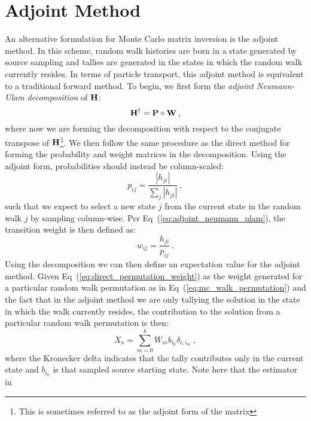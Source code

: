 \section{Adjoint Method}
\label{sec:adjoint_mc}
An alternative formulation for Monte Carlo matrix inversion is the
adjoint method. In this scheme, random walk histories are born in a
state generated by source sampling and tallies are generated in the
states in which the random walk currently resides. In terms of
particle transport, this adjoint method is equivalent to a traditional
forward method. To begin, we first form the \textit{adjoint
  Neumann-Ulam decomposition} of $\mathbf{H}$:
\begin{equation}
  \mathbf{H}^{\dagger} = \mathbf{P} \circ \mathbf{W}\:,
  \label{eq:adjoint_neumann_ulam}
\end{equation}
where now we are forming the decomposition with respect to the
conjugate transpose of $\mathbf{H}$\footnote{This is sometimes referred to
  as the adjoint form of the matrix}. We then follow the same
procedure as the direct method for forming the probability and weight
matrices in the decomposition. Using the adjoint form, probabilities
should instead be column-scaled:
\begin{equation}
  p_{ij} = \frac{|h_{ji}|}{\sum_j |h_{ji}|}\:,
  \label{eq:adjoint_probability}
\end{equation}
such that we expect to select a new state $j$ from the current state
in the random walk $j$ by sampling column-wise. Per
Eq~(\ref{eq:adjoint_neumann_ulam}), the transition weight is then
defined as:
\begin{equation}
  w_{ij} = \frac{h_{ji}}{p_{ij}}\:.
  \label{eq:adjoint_weight}
\end{equation}
Using the decomposition we can then define an expectation value for
the adjoint method. Given Eq~(\ref{eq:direct_permutation_weight}) as
the weight generated for a particular random walk permutation as in
Eq~(\ref{eq:mc_walk_permutation}) and the fact that in the adjoint
method we are only tallying the solution in the state in which the
walk currently resides, the contribution to the solution from a
particular random walk permutation is then:
\begin{equation}
  X_{\nu} = \sum_{m=0}^k W_{m} b_{i_0} \delta_{i,i_m}\:,
  \label{eq:adjoint_permutation_contribution}
\end{equation}
where the Kronecker delta indicates that the tally contributes only in
the current state and $b_{i_0}$ is that sampled source starting
state. Note here that the estimator in
